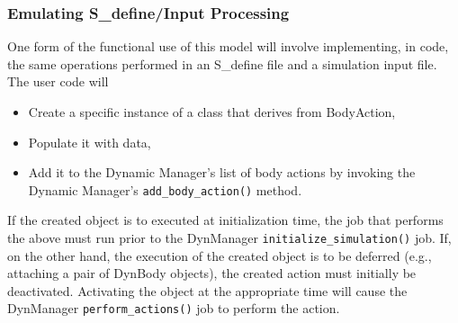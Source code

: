 \subsubsection{Emulating S\_define/Input Processing}
One form of the functional use of this model will involve
implementing, in code, the same operations performed in an S\_define file
and a simulation input file. The user code will\begin{itemize}
\item Create a specific instance of a class that derives from BodyAction,
\item Populate it with data,
\item Add it to the Dynamic Manager's list of body actions
by invoking the Dynamic Manager's {\tt add\_body\_action()} method.
\end{itemize}

If the created object is to executed at initialization time, the job
that performs the above must run prior to the DynManager
{\tt initialize\_simulation()} job. If, on the other hand, the execution
of the created object is to be deferred (e.g., attaching a pair of
DynBody objects), the created action must initially be deactivated.
Activating the object at the appropriate time will cause the DynManager
{\tt perform\_actions()} job to perform the action.

